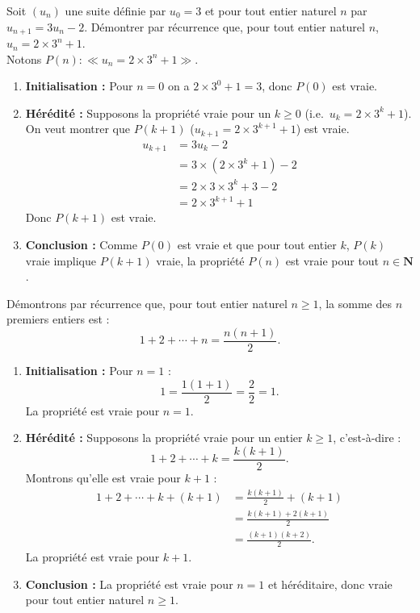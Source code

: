 \documentclass[11pt,a4paper,openany]{book}
\theoremstyle{definition}
\begin{document}
    \begin{Exemple}
        Soit $(u_n)$ une suite définie par $u_0=3$ et pour tout entier naturel $n$ par
        $u_{n+1}=3u_n-2$.
        Démontrer par récurrence que, pour tout entier naturel $n$, $u_n=2\times 3^n+1$.\\
        Notons $P(n) : \ll u_n=2\times 3^n+1\gg$.
        \begin{enumerate}
            \item \textbf{Initialisation :} Pour $n=0$ on a $2\times 3^0+1=3$,
                  donc $P(0)$ est vraie.
            \item \textbf{Hérédité :} Supposons la propriété vraie pour un $k\geq 0$
                  (i.e.\ $u_k=2\times 3^k+1$). On veut montrer que $P(k+1)$
                  ($u_{k+1}=2\times 3^{k+1}+1$) est vraie.
            \begin{align*}
                u_{k+1}&=3u_k-2\\
                       &=3\times (2\times 3^k+1)-2\\
                       &=2\times 3\times 3^k+3-2\\
                       &=2\times 3^{k+1}+1
            \end{align*}
            Donc $P(k+1)$ est vraie.
            \item \textbf{Conclusion :} Comme $P(0)$ est vraie et que pour tout entier $k$,
                  $P(k)$ vraie implique $P(k+1)$ vraie, la propriété $P(n)$ est vraie pour
                  tout $n\in\mathbf{N}$.
        \end{enumerate}
    \end{Exemple}

    \begin{Exemple}
    Démontrons par récurrence que, pour tout entier naturel $n\geq 1$, la somme des $n$
    premiers entiers est :
    \[
        1 + 2 + \cdots + n = \frac{n(n+1)}{2}.
    \]
    \begin{enumerate}
        \item \textbf{Initialisation :} Pour $n = 1$ :
        \[
            1 = \frac{1(1+1)}{2} = \frac{2}{2} = 1.
        \]
        La propriété est vraie pour $n = 1$.
        \item \textbf{Hérédité :} Supposons la propriété vraie pour un entier $k \geq 1$,
        c'est-à-dire :
        \[
            1 + 2 + \cdots + k = \frac{k(k+1)}{2}.
        \]
        Montrons qu'elle est vraie pour $k+1$ :
        \begin{align*}
            1 + 2 + \cdots + k + (k+1)
            &= \frac{k(k+1)}{2} + (k+1) \\
            &= \frac{k(k+1) + 2(k+1)}{2} \\
            &= \frac{(k+1)(k+2)}{2}.
        \end{align*}
        La propriété est vraie pour $k+1$.
        \item \textbf{Conclusion :} La propriété est vraie pour $n=1$ et héréditaire,
        donc vraie pour tout entier naturel $n\geq 1$.
    \end{enumerate}
    \end{Exemple}
\end{document}
